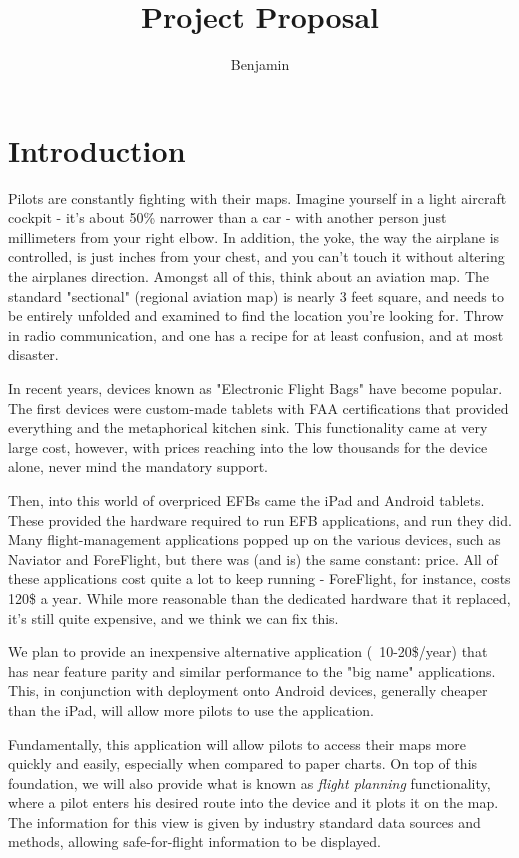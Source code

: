 \documentclass[10pt,a4paper]{report}
\author{Benjamin}
\title{Project Proposal}
\begin{document}
\section{Introduction}
Pilots are constantly fighting with their maps. Imagine yourself in a light aircraft cockpit - it's about 50\% narrower than a car - with another person just millimeters from your right elbow. In addition, the yoke, the way the airplane is controlled, is just inches from your chest, and you can't touch it without altering the airplanes direction. Amongst all of this, think about an aviation map. The standard "sectional" (regional aviation map) is nearly 3 feet square, and needs to be entirely unfolded and examined to find the location you're looking for. Throw in radio communication, and one has a recipe for at least confusion, and at most disaster. 

In recent years, devices known as "Electronic Flight Bags" have become popular. The first devices were custom-made tablets with FAA certifications that provided everything and the metaphorical kitchen sink. This functionality came at very large cost, however, with prices reaching into the low thousands for the device alone, never mind the mandatory support.

Then, into this world of overpriced EFBs came the iPad and Android tablets. These provided the hardware required to run EFB applications, and run they did. Many flight-management applications popped up on the various devices, such as Naviator and ForeFlight, but there was (and is) the same constant: price. All of these applications cost quite a lot to keep running - ForeFlight, for instance, costs 120\$ a year. While more reasonable than the dedicated hardware that it replaced, it's still quite expensive, and we think we can fix this.

We plan to provide an inexpensive alternative application (~10-20\$/year) that has near feature parity and similar performance to the "big name" applications. This, in conjunction with deployment onto Android devices, generally cheaper than the iPad, will allow more pilots to use the application.

Fundamentally, this application will allow pilots to access their maps more quickly and easily, especially when compared to paper charts. On top of this foundation, we will also provide what is known as \emph{flight planning} functionality, where a pilot enters his desired route into the device and it plots it on the map. The information for this view is given by industry standard data sources and methods, allowing safe-for-flight information to be displayed.
\end{document}
